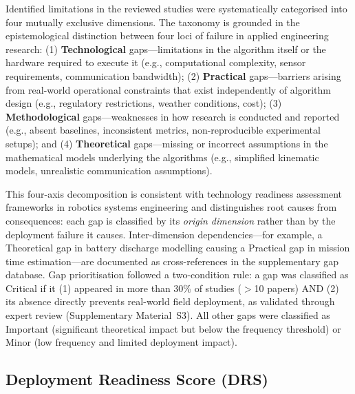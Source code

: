 \documentclass[review,3p,times]{elsarticle}
\begin{document}
Identified limitations in the reviewed studies were systematically categorised into four mutually exclusive dimensions. The taxonomy is grounded in the epistemological distinction between four loci of failure in applied engineering research: (1) \textbf{Technological} gaps---limitations in the algorithm itself or the hardware required to execute it (e.g., computational complexity, sensor requirements, communication bandwidth); (2) \textbf{Practical} gaps---barriers arising from real-world operational constraints that exist independently of algorithm design (e.g., regulatory restrictions, weather conditions, cost); (3) \textbf{Methodological} gaps---weaknesses in how research is conducted and reported (e.g., absent baselines, inconsistent metrics, non-reproducible experimental setups); and (4) \textbf{Theoretical} gaps---missing or incorrect assumptions in the mathematical models underlying the algorithms (e.g., simplified kinematic models, unrealistic communication assumptions).

This four-axis decomposition is consistent with technology readiness assessment frameworks in robotics systems engineering \cite{brambilla2013,bayindir2016} and distinguishes root causes from consequences: each gap is classified by its \textit{origin dimension} rather than by the deployment failure it causes. Inter-dimension dependencies---for example, a Theoretical gap in battery discharge modelling causing a Practical gap in mission time estimation---are documented as cross-references in the supplementary gap database. Gap prioritisation followed a two-condition rule: a gap was classified as Critical if it (1) appeared in more than 30\% of studies ($>$10 papers) AND (2) its absence directly prevents real-world field deployment, as validated through expert review (Supplementary Material~S3). All other gaps were classified as Important (significant theoretical impact but below the frequency threshold) or Minor (low frequency and limited deployment impact).

\subsection{Deployment Readiness Score (DRS)}
\label{subsec:drs}
\end{document}
